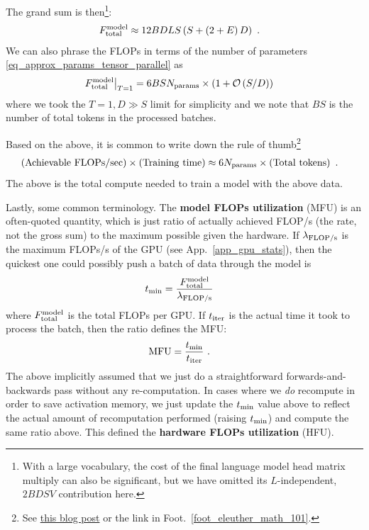 \documentclass[11pt]{article}
\begin{document}
The grand sum is then\footnote{With a large vocabulary, the cost of the final language model head
matrix multiply can also be significant, but we have omitted its $ L $-independent,  $ 2BDSV $
contribution here. }:
\begin{align}
F _{ {\rm total}  } ^{ {\rm  model}  } &\approx 12 BDLS \left ( S + \left ( 2+E \right )D \right ) \label{eq_model_flops}\ .
\end{align}
We can also phrase the FLOPs in terms of the number of parameters \eqref{eq_approx_params_tensor_parallel} as
\begin{align}
 F _{ {\rm total}  } ^{ {\rm  model}  } \big| _{ T=1 }  &= 6BS N _{ {\rm  params}  }\times \left ( 1 + \mathcal{O} \left( S/D\right)  \right )
\end{align}
where we took the $ T=1, D \gg S $ limit for simplicity and we note that $ BS $  is the number of
total tokens in the processed batches.

Based on the above, it is common to write down the rule of
thumb\footnote{See
\href{https://medium.com/@dzmitrybahdanau/the-flops-calculus-of-language-model-training-3b19c1f025e4}{this
blog post} or the link in Foot.~\ref{foot_eleuther_math_101}.}
\begin{align}
  \left ( {\rm Achievable \ FLOPs/sec}  \right ) \times \left ( {\rm  Training \ time}  \right )
  &\approx 6 N _{ {\rm params}  } \times \left ( {\rm Total \ tokens} \right ) \ . \label{eq_training_rule_of_thumb}
\end{align}
The above is the total compute needed to train a model with the above data.


Lastly, some common terminology. The \textbf{model FLOPs utilization} (MFU) is an often-quoted quantity, which is just ratio
of actually achieved FLOP/s (the rate, not the gross sum) to the maximum possible given the hardware. If $
\lambda _{ {\rm FLOP/s} }  $ is the maximum FLOPs/s of the GPU (see App.~\ref{app_gpu_stats}), then the
quickest one could possibly push a batch of data through the model is
\begin{align}
  t _{ {\rm  min} }  &= \frac{ F _{ {\rm total}  } ^{ {\rm  model}  }  }{   \lambda _{ {\rm FLOP/s} } }
\end{align}
where $ F _{ {\rm total}  } ^{ {\rm  model} }  $ is the total FLOPs per GPU. If $ t _{ {\rm  iter} } $ is the actual time it
took to process the batch, then the ratio defines the MFU:
\begin{align}
  {\rm MFU}  &= \frac{ t _{ {\rm min} } }{ t _{ {\rm iter} } } \label{eq_mfu}\ .
\end{align}
The above implicitly assumed that we just do a straightforward forwards-and-backwards pass without
any re-computation.  In cases where we \textit{do} recompute in order to save activation memory, we
just update the $ t _{ {\rm min} } $ value above to reflect the actual amount of recomputation
performed (raising $ t _{ {\rm  min} } $) and compute the same ratio above. This defined the
\textbf{hardware FLOPs utilization}  (HFU).
\end{document}
